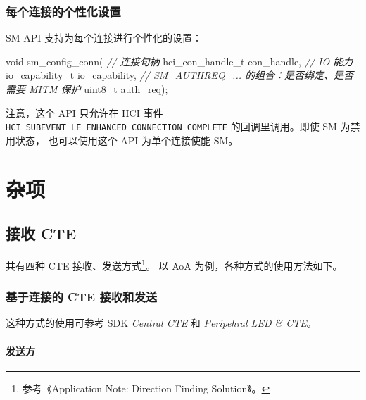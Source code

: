 \documentclass[
  12pt,
]{book}
\newenvironment{Shaded}{\begin{snugshade}}{\end{snugshade}}
\newcommand{\CommentTok}[1]{\textcolor[rgb]{0.56,0.35,0.01}{\textit{#1}}}
\newcommand{\DataTypeTok}[1]{\textcolor[rgb]{0.13,0.29,0.53}{#1}}
\newcommand{\NormalTok}[1]{#1}
\begin{document}
\hypertarget{ux6bcfux4e2aux8fdeux63a5ux7684ux4e2aux6027ux5316ux8bbeux7f6e}{%
\subsection{每个连接的个性化设置}\label{ux6bcfux4e2aux8fdeux63a5ux7684ux4e2aux6027ux5316ux8bbeux7f6e}}

SM API 支持为每个连接进行个性化的设置：

\begin{Shaded}
\begin{Highlighting}[]
\DataTypeTok{void}\NormalTok{ sm_config_conn(}
  \CommentTok{// 连接句柄}
\NormalTok{  hci_con_handle_t con_handle,}
  \CommentTok{// IO 能力}
\NormalTok{  io_capability_t io_capability,}
  \CommentTok{// SM_AUTHREQ_... 的组合：是否绑定、是否需要 MITM 保护}
  \DataTypeTok{uint8_t}\NormalTok{ auth_req);}
\end{Highlighting}
\end{Shaded}

注意，这个 API 只允许在 HCI 事件 \texttt{HCI\_SUBEVENT\_LE\_ENHANCED\_CONNECTION\_COMPLETE} 的回调里调用。即使 SM 为禁用状态，
也可以使用这个 API 为单个连接使能 SM。

\hypertarget{ch-misc}{%
\chapter{杂项}\label{ch-misc}}

\hypertarget{ux63a5ux6536-cte}{%
\section{接收 CTE}\label{ux63a5ux6536-cte}}

共有四种 CTE 接收、发送方式\footnote{参考《Application Note: Direction Finding Solution》。}。
以 AoA 为例，各种方式的使用方法如下。

\hypertarget{ux57faux4e8eux8fdeux63a5ux7684-cte-ux63a5ux6536ux548cux53d1ux9001}{%
\subsection{基于连接的 CTE 接收和发送}\label{ux57faux4e8eux8fdeux63a5ux7684-cte-ux63a5ux6536ux548cux53d1ux9001}}

这种方式的使用可参考 SDK \emph{Central CTE} 和 \emph{Peripehral LED \& CTE}。

\hypertarget{ux53d1ux9001ux65b9}{%
\subsubsection{发送方}\label{ux53d1ux9001ux65b9}}
\end{document}
